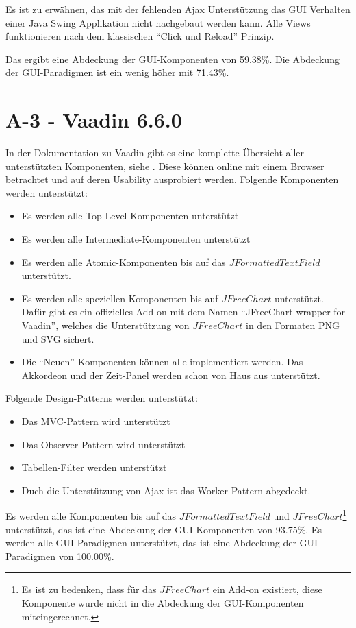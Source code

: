 Es ist zu erwähnen, das mit der fehlenden \ac{Ajax} Unterstützung das
\ac{GUI} Verhalten einer Java Swing Applikation nicht nachgebaut werden kann.
Alle Views funktionieren nach dem klassischen ``Click und Reload'' Prinzip.

Das ergibt eine Abdeckung der GUI-Komponenten von 59.38\%. Die Abdeckung der
GUI-Paradigmen ist ein wenig höher mit 71.43\%.

\section{A-3 - Vaadin 6.6.0}

In der Dokumentation zu Vaadin gibt es eine komplette Übersicht aller
unterstützten Komponenten, siehe \cite{VaadinKomponenten}. Diese können online
mit einem Browser betrachtet und auf deren Usability ausprobiert werden.
Folgende Komponenten werden unterstützt:

\begin{itemize}
  \item Es werden alle Top-Level Komponenten unterstützt
  \item Es werden alle Intermediate-Komponenten unterstützt
  \item Es werden alle Atomic-Komponenten bis auf das
  \(JFormattedTextField\) unterstützt.
  \item Es werden alle speziellen Komponenten bis auf
  \(JFreeChart\) unterstützt. Dafür gibt es ein offizielles
  Add-on mit dem Namen ``JFreeChart wrapper for Vaadin'', welches die
  Unterstützung von \(JFreeChart\) in den Formaten \ac{PNG} und \ac{SVG}
  sichert.
  \item Die ``Neuen'' Komponenten können alle implementiert werden. Das
  Akkordeon und der Zeit-Panel werden schon von Haus aus unterstützt.
\end{itemize}

Folgende Design-Patterns werden unterstützt:

\begin{itemize}
  \item Das MVC-Pattern wird unterstützt
  \item Das Observer-Pattern wird unterstützt
  \item Tabellen-Filter werden unterstützt
  \item Duch die Unterstützung von Ajax ist das Worker-Pattern abgedeckt.
\end{itemize}

Es werden alle Komponenten bis auf das \(JFormattedTextField\) und
\(JFreeChart\)\footnote{Es ist zu bedenken, dass für das \(JFreeChart\) ein
Add-on existiert, diese Komponente wurde nicht in die Abdeckung der
GUI-Komponenten miteingerechnet.} unterstützt, das ist eine Abdeckung der
GUI-Komponenten von 93.75\%. Es werden alle GUI-Paradigmen unterstützt, das ist
eine Abdeckung der GUI-Paradigmen von 100.00\%.

